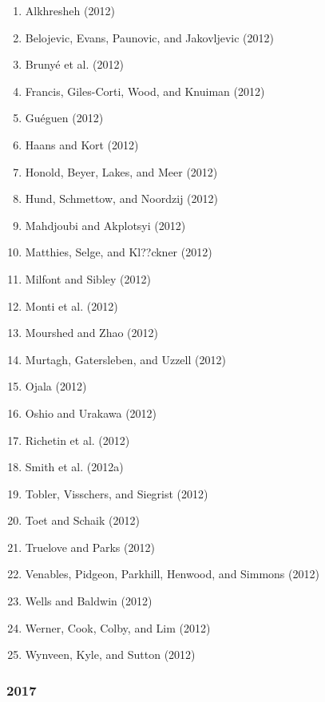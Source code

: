 \documentclass[english,man]{apa6}
\providecommand{\tightlist}{%
  \setlength{\itemsep}{0pt}\setlength{\parskip}{0pt}}
\begin{document}
\begin{enumerate}
\def\labelenumi{\arabic{enumi})}
\tightlist
\item
  Alkhresheh (2012)
\item
  Belojevic, Evans, Paunovic, and Jakovljevic (2012)
\item
  Brunyé et al. (2012)
\item
  Francis, Giles-Corti, Wood, and Knuiman (2012)
\item
  Guéguen (2012)
\item
  Haans and Kort (2012)
\item
  Honold, Beyer, Lakes, and Meer (2012)
\item
  Hund, Schmettow, and Noordzij (2012)
\item
  Mahdjoubi and Akplotsyi (2012)
\item
  Matthies, Selge, and Kl??ckner (2012)
\item
  Milfont and Sibley (2012)
\item
  Monti et al. (2012)
\item
  Mourshed and Zhao (2012)
\item
  Murtagh, Gatersleben, and Uzzell (2012)
\item
  Ojala (2012)
\item
  Oshio and Urakawa (2012)
\item
  Richetin et al. (2012)
\item
  Smith et al. (2012a)
\item
  Tobler, Visschers, and Siegrist (2012)
\item
  Toet and Schaik (2012)
\item
  Truelove and Parks (2012)
\item
  Venables, Pidgeon, Parkhill, Henwood, and Simmons (2012)
\item
  Wells and Baldwin (2012)
\item
  Werner, Cook, Colby, and Lim (2012)
\item
  Wynveen, Kyle, and Sutton (2012)
\end{enumerate}

\subsubsection{2017}\label{section-23}
\end{document}
